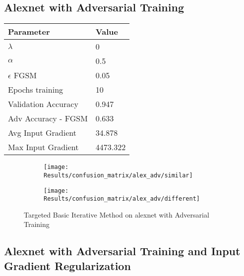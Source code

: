 \documentclass[draft,final]{vutinfth} %
\begin{document}
\subsection{Alexnet with Adversarial Training}
\begin{table}[h]
  \centering
  \begin{tabular}{ll}
    \toprule
			Parameter			& Value   \\
    \midrule
			$\lambda$								& 0				\\
			$\alpha$								& 0.5			\\
			$\epsilon$ FGSM					& 0.05		\\
			Epochs training					& 10			\\
			
			Validation Accuracy			& 0.947		\\
			Adv Accuracy - FGSM			& 0.633 	\\
			
			Avg Input Gradient			& 34.878	\\
			Max Input Gradient 			& 4473.322\\
    \bottomrule
  \end{tabular}
\end{table}


\begin{figure}[h]
  \begin{subfigure}[b]{0.5\columnwidth}
		\centering
    \texttt{[image: Results/confusion\_matrix/alex\_adv/similar]}
    \label{fig:exp:cm:alex_adv:similar}
  \end{subfigure}
  \begin{subfigure}[b]{0.5\columnwidth}
		\centering
    \texttt{[image: Results/confusion\_matrix/alex\_adv/different]}
    \label{fig:exp:cm:alex_adv:different}
  \end{subfigure}
  \caption{Targeted Basic Iterative Method on alexnet with Adversarial Training}
		\label{fig:exp:cm:alex_adv}
\end{figure}
\clearpage

\subsection{Alexnet with Adversarial Training and Input Gradient Regularization}
\end{document}
